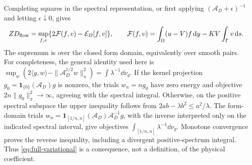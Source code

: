 Completing squares in the spectral representation, or first applying
$(\mathscr A_D+\epsilon)^{-1}$ and letting $\epsilon\downarrow0$,
gives
\begin{equation}\label{eq:full-variational}
 ZD_{\mathrm{flow}}=\sup_{f,v}\{2\mathcal F(f,v)-\mathcal E_D[f,v]\},\qquad
 \mathcal F(f,v)=\int_\Omega(u-V)f\,\mathrm d y-KV\int_\Gamma v\,\mathrm d s.
\end{equation}
The supremum is over the closed form domain, equivalently over smooth
pairs. For completeness, the general identity used here is
$\sup_w(2\langle g,w\rangle-\|\mathscr A_D^{1/2}w\|_\pi^2)
=\int\lambda^{-1}\dd\nu_g$. If the kernel projection
$g_0=\mathbf1_{\{0\}}(\mathscr A_D)g$ is nonzero, the trials
$w_n=ng_0$ have zero energy and objective
$2n\|g_0\|_\pi^2\to\infty$, agreeing with the spectral integral.
Otherwise, on the positive spectral subspace the upper inequality
follows from $2ab-\lambda b^2\le a^2/\lambda$. The form-domain trials
$w_n=\mathbf1_{[1/n,n]}(\mathscr A_D)\mathscr A_D^{-1}g$,
with the inverse interpreted only on the indicated spectral interval,
give objectives $\int_{[1/n,n]}\lambda^{-1}\dd\nu_g$.
Monotone convergence proves the reverse inequality, including a
divergent positive-spectrum integral. Thus \eqref{eq:full-variational}
is a consequence, not a
definition, of the physical coefficient.


